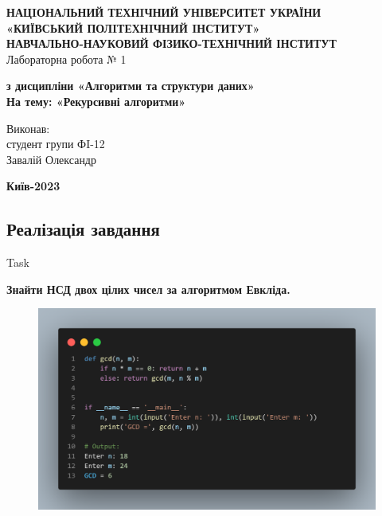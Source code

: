 \documentclass[a4paper,12pt]{article}
\newcommand{\RomanNumeralCaps}[1]{\MakeUppercase{\romannumeral #1}}
\begin{document}
\begin{center}
    \hfill \break
    \large{\textbf{НАЦIОНАЛЬНИЙ ТЕХНIЧНИЙ УНIВЕРСИТЕТ УКРАЇНИ\\
            «КИЇВСЬКИЙ ПОЛIТЕХНIЧНИЙ IНСТИТУТ»\\
            НАВЧАЛЬНО-НАУКОВИЙ ФІЗИКО-ТЕХНІЧНИЙ ІНСТИТУТ}}\\
    \hfill \break \hfill \break \hfill\break \hfill \break \hfill \break \hfill \break \hfill \break
    \hfill \break \hfill \break \hfill \break \hfill \break
    \large{Лабораторна робота № 1}
    \begin{center}
        \normalsize{\textbf{з дисципліни «Алгоритми та структури даних» \\
        На тему: «Рекурсивні алгоритми» \\}}
    \end{center}
\end{center}
\hfill \break \hfill \break \hfill \break \hfill \break \hfill \break \hfill \break \hfill \break
\hfill \break \hfill \break \hfill \break \hfill \break \hfill \break \hfill \break 
\begin{flushright}
    \large{ \hspace{35pt} Виконав:\\
        студент групи ФI-12\\
        Завалій Олександр} 
\end{flushright}
\hfill \break \hfill \break \hfill \break \hfill \break \hfill \break \hfill \break \hfill \break
\hfill \break
\begin{center} \textbf{Київ-2023} \end{center}
\thispagestyle{empty}

\newpage
    \begin{center}
        \section*{\bfseries{Реалізація завдання}}
    \end{center}
    \begin{center}
        \Large{Task \RomanNumeralCaps{2}}
    \end{center}
    \textbf{Знайти НСД двох цілих чисел за алгоритмом Евкліда.}
    \begin{figure}[h!]
        \begin{minipage}[h]{1\linewidth}
            \centering
            \includegraphics[width=0.9\linewidth]{Prt sc/Figure_1.png}  
        \end{minipage}
    \end{figure}
\end{document}
